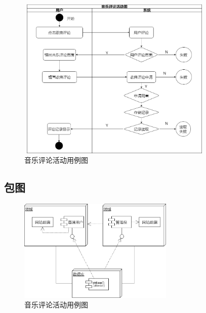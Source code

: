 \documentclass[UTF8,14pt]{article}
\numberwithin{figure}{subsubsection}
\numberwithin{table}{subsubsection}
\begin{document}
\vspace*{-1cm}
\begin{figure}[H]
	\centering
	\includegraphics[width=9.41cm,height=7.8cm]{figures/用例图3.png}
	\caption{音乐评论活动用例图}
\end{figure}

\subsection{包图}
\begin{figure}[H]
	\centering
	\includegraphics[width=7.41cm,height=4.91cm]{figures/包图.png}
	\caption{音乐评论活动用例图}
\end{figure}
\end{document}
